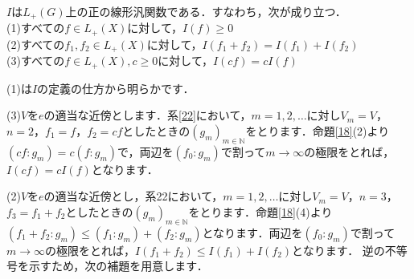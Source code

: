 \begin{yprop}\label{23}
$I$は$L_{+}(G)$上の正の線形汎関数である．すなわち，次が成り立つ． \\
(1)すべての$f \in L_{+}(X)$に対して，$I(f) \ge 0$\\
(2)すべての$f_{1},f_{2} \in L_{+}(X)$に対して，$I(f_{1}+f_{2})=I(f_{1})+I(f_{2})$\\
(3)すべての$f \in L_{+}(X), c \ge 0$に対して，$I(cf)=cI(f)$
\end{yprop}
\begin{Proof}
(1)は$I$の定義の仕方から明らかです．

(3)$V$を$e$の適当な近傍とします．系\ref{22}において，$m=1,2,\ldots$に対し$V_m=V$，$n=2$，$f_1=f$，$f_2=cf$としたときの$(g_m)_{m \in \mathbb{N}}$をとります．命題\ref{18}(2)より$(cf : g_m)=c(f : g_m)$で，両辺を$(f_0 : g_m)$で割って$m \to \infty$の極限をとれば，$I(cf)=cI(f)$となります．

(2)$V$を$e$の適当な近傍とし，系22において，$m=1,2,\ldots$に対し$V_m=V$，$n=3$，$f_3=f_1+f_2$としたときの$(g_m)_{m \in \mathbb{N}}$をとります．命題\ref{18}(4)より$(f_{1}+f_{2} : g_m ) \le (f_1 : g_m )+(f_2 : g_m)$となります．両辺を$(f_0 : g_m)$で割って$m \to \infty$の極限をとれば，$I(f_1+f_2) \le I(f_1)+I(f_2)$となります．
逆の不等号を示すため，次の補題を用意します．


\end{Proof}
